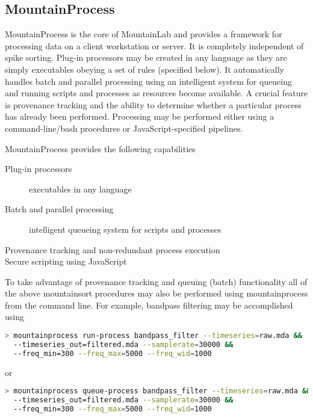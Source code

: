 \documentclass{article}
\begin{document}
\subsection{MountainProcess}

MountainProcess is the core of MountainLab and provides a framework for processing data on a client workstation or server. It is completely independent of spike sorting. Plug-in processors may be created in any language as they are simply executables obeying a set of rules (specified below). It automatically handles batch and parallel processing using an intelligent system for queueing and running scripts and processes as resources become available. A crucial feature is provenance tracking and the ability to determine whether a particular process has already been performed. Processing may be performed either using a command-line/bash procedures or JavaScript-specified pipelines.

MountainProcess provides the following capabilities
\begin{description}
\item[Plug-in processors] executables in any language
\item[Batch and parallel processing] intelligent queueing system for scripts and processes
\item[Provenance tracking and non-redundant process execution]
\item[Secure scripting using JavaScript]
\end{description}

To take advantage of provenance tracking and queuing (batch) functionality all of the above mountainsort procedures may also be performed using mountainprocess from the command line. For example, bandpass filtering may be accomplished using
\begin{lstlisting}[language=bash]
> mountainprocess run-process bandpass_filter --timeseries=raw.mda &&
  --timeseries_out=filtered.mda --samplerate=30000 &&
  --freq_min=300 --freq_max=5000 --freq_wid=1000
\end{lstlisting}
or
\begin{lstlisting}[language=bash]
> mountainprocess queue-process bandpass_filter --timeseries=raw.mda &&
  --timeseries_out=filtered.mda --samplerate=30000 &&
  --freq_min=300 --freq_max=5000 --freq_wid=1000
\end{lstlisting}
\end{document}
